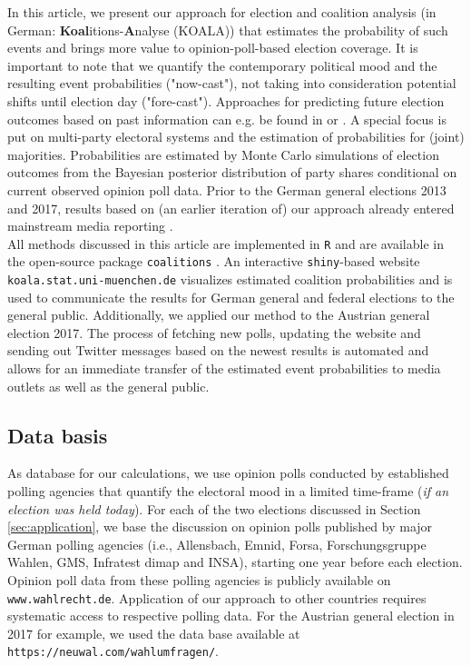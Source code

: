 \documentclass[smallcondensed]{svjour3}     %
\begin{document}
In this article, we present our approach for election and coalition analysis
(in German: \textbf{Koal}itions-\textbf{A}nalyse (KOALA)) that estimates the
probability of such events and brings more value to opinion-poll-based election
coverage. It is important to note that we quantify the contemporary political mood
and the resulting event probabilities ("now-cast"), not taking into consideration
potential shifts until election day ("fore-cast"). Approaches for predicting
future election outcomes based on past information can e.g. be found in
\citet{graefe_2017} or \citet{norpoth_gschwend_2010}. A special focus is put on
multi-party electoral systems and the estimation of probabilities for (joint) majorities.
Probabilities are estimated by Monte Carlo simulations of election outcomes from the
Bayesian posterior distribution of party shares conditional on current observed
opinion poll data. Prior to the German general elections 2013 and 2017, results
based on (an earlier iteration of) our approach already entered mainstream media
reporting \citep[cf.][]{wahlistik_2013, gelitz_2017}.\\

All methods discussed in this article are implemented in \texttt{R} \citep{r_2017}
and are available in the open-source package \texttt{coalitions} \citep{bender_bauer_2018}.
An interactive \texttt{shiny}-based \citep{chang_2017} website
\texttt{koala.stat.uni-\allowbreak muenchen.\allowbreak de} visualizes estimated
coalition probabilities and is used to communicate the results for German general
and federal elections to the general public. Additionally, we applied our method
to the Austrian general election 2017. The process of fetching new polls,
updating the website and sending out Twitter messages based on the newest results
is automated and allows for an immediate transfer of the estimated event
probabilities to media outlets as well as the general public.

\subsection{Data basis}\label{ssec:data-basis}
As database for our calculations, we use opinion polls conducted by established
polling agencies that quantify the electoral mood in a limited time-frame
(\textit{if an election was held today}). For each of the two elections discussed
in Section \ref{sec:application}, we base the discussion on opinion polls published
by major German polling agencies (i.e., Allensbach, Emnid, Forsa, Forschungsgruppe Wahlen,
GMS, Infratest dimap and INSA), starting one year before each election.
Opinion poll data from these polling agencies is publicly available
on \texttt{www.wahlrecht.de}. Application of our approach to other countries
requires systematic access to respective polling data. For the Austrian general
election in 2017 for example, we used the data base available at
\texttt{https://neuwal.com/wahlumfragen/}.
\end{document}
